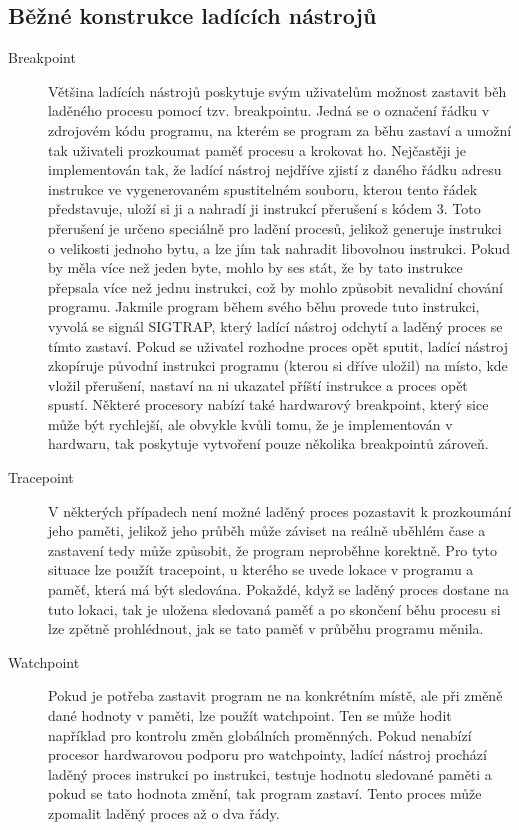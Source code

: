 \documentclass[bc,male,java,dept460]{diploma}						%
\begin{document}
	\subsection{Běžné konstrukce ladících nástrojů}
		\begin{description}
			\item[Breakpoint]
				Většina ladících nástrojů poskytuje svým uživatelům možnost zastavit běh laděného procesu pomocí tzv. breakpointu.
				Jedná se o označení řádku v zdrojovém kódu programu, na kterém se program za běhu zastaví a umožní tak uživateli prozkoumat paměť procesu a krokovat ho.
				Nejčastěji je implementován tak, že ladící nástroj nejdříve zjistí z daného řádku adresu instrukce ve vygenerovaném spustitelném souboru, kterou tento
				řádek představuje, uloží si ji a nahradí ji instrukcí přerušení s kódem 3. Toto přerušení je určeno speciálně pro ladění procesů, jelikož generuje
				instrukci o velikosti jednoho bytu, a lze jím tak nahradit libovolnou instrukci\cite[306]{intel}. Pokud by měla více než jeden byte, mohlo by ses
				stát, že by tato instrukce přepsala více než jednu instrukci, což by mohlo způsobit nevalidní chování programu. Jakmile program během svého běhu
				provede tuto instrukci, vyvolá se signál SIGTRAP, který ladící nástroj odchytí a laděný proces se tímto zastaví. Pokud se uživatel rozhodne proces
				opět sputit, ladící nástroj zkopíruje původní instrukci programu (kterou si dříve uložil) na místo, kde vložil přerušení, nastaví na ni ukazatel
				příští instrukce a proces opět spustí.
				Některé procesory nabízí také hardwarový breakpoint, který sice může být rychlejší, ale obvykle kvůli tomu, že je implementován v hardwaru, tak poskytuje
				vytvoření pouze několika breakpointů zároveň.
			\item[Tracepoint]
				V některých případech není možné laděný proces pozastavit k prozkoumání jeho paměti, jelikož jeho průběh může záviset na reálně uběhlém čase a zastavení
				tedy může způsobit, že program neproběhne korektně. Pro tyto situace lze použít tracepoint, u kterého se uvede lokace v programu a paměť, která má být
				sledována. Pokaždé, když se laděný proces dostane na tuto lokaci, tak je uložena sledovaná paměť a po skončení běhu procesu si lze zpětně prohlédnout,
				jak se tato paměť v průběhu programu měnila.
			\item[Watchpoint]
				Pokud je potřeba zastavit program ne na konkrétním místě, ale při změně dané hodnoty v paměti, lze použít watchpoint. Ten se může hodit například pro
				kontrolu změn globálních proměnných. Pokud nenabízí procesor hardwarovou podporu pro watchpointy, ladící nástroj prochází laděný proces instrukci po
				instrukci, testuje hodnotu sledované paměti a pokud se tato hodnota změní, tak program zastaví. Tento proces může zpomalit laděný proces až o
				dva řády\cite{gdb-watchpoint}.
		\end{description}
		
\end{document}
